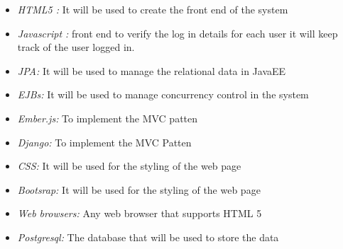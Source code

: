 \documentclass[a4paper,12pt]{article}
\begin{document}
\begin{itemize}
	\item \textit{HTML5 : }It will be used to create the front end of the system
\end{itemize}
\begin{itemize}
	\item \textit{Javascript :} front end to verify the log in details for each user it will keep track of the user logged in.
\end{itemize}
\begin{itemize}
	\item \textit{JPA:} It will be used to manage the relational data in JavaEE
\end{itemize}
\begin{itemize}
	\item \textit{EJBs:} It will be used to manage concurrency control in the system
\end{itemize}
\begin{itemize}
	\item \textit{Ember.js:} To implement the MVC patten
\end{itemize}
\begin{itemize}
	\item \textit{Django:} To implement the MVC Patten
\end{itemize}
\begin{itemize}
	\item \textit{CSS:} It will be used for the styling of the web page
\end{itemize}
\begin{itemize}
	\item \textit{Bootsrap:} It will be used for the styling of the web page 
\end{itemize}
\begin{itemize}
	\item \textit{Web browsers:} Any web browser that supports HTML 5
\end{itemize}
\begin{itemize}
	\item \textit{Postgresql:} The database that will be used to store the data
\end{itemize}
\end{document}
